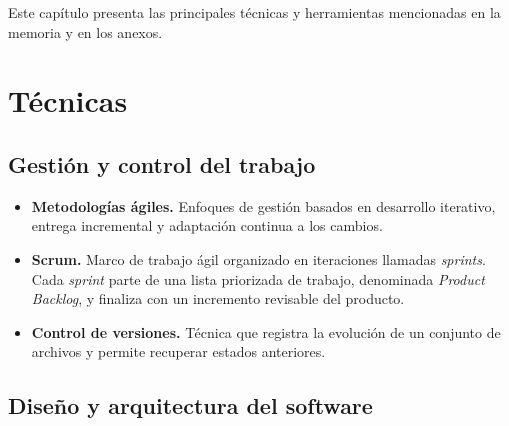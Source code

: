 
Este capítulo presenta las principales técnicas y herramientas mencionadas en la memoria y en los anexos.

\section{Técnicas}

\subsection{Gestión y control del trabajo}

\begin{itemize}
	\item \textbf{Metodologías ágiles.} Enfoques de gestión basados en desarrollo iterativo, entrega incremental y adaptación continua a los cambios.
	
	\item \textbf{Scrum.} Marco de trabajo ágil organizado en iteraciones llamadas \textit{sprints}. Cada \textit{sprint} parte de una lista priorizada de trabajo, denominada \textit{Product Backlog}, y finaliza con un incremento revisable del producto.
	
	\item \textbf{Control de versiones.} Técnica que registra la evolución de un conjunto de archivos y permite recuperar estados anteriores.
\end{itemize}

\subsection{Diseño y arquitectura del software}

